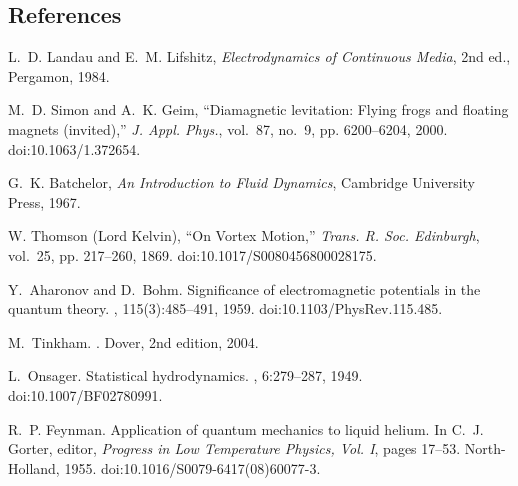 \documentclass[reprint,aps,onecolumn,nofootinbib]{revtex4-2}
\begin{document}
\subsection*{References}
\begin{thebibliography}{9}
	L.~D. Landau and E.~M. Lifshitz,
	\newblock \emph{Electrodynamics of Continuous Media}, 2nd ed.,
	Pergamon, 1984.

	M.~D. Simon and A.~K. Geim,
	``Diamagnetic levitation: Flying frogs and floating magnets (invited),''
	\emph{J. Appl. Phys.}, vol.~87, no.~9, pp. 6200--6204, 2000.
	doi:10.1063/1.372654.

	G.~K. Batchelor,
	\newblock \emph{An Introduction to Fluid Dynamics},
	Cambridge University Press, 1967.

	W. Thomson (Lord Kelvin),
	``On Vortex Motion,''
	\emph{Trans. R. Soc. Edinburgh}, vol.~25, pp. 217--260, 1869.
	doi:10.1017/S0080456800028175.
\end{thebibliography}


\begin{thebibliography}{10}

Y.~Aharonov and D.~Bohm.
\newblock Significance of electromagnetic potentials in the quantum theory.
, 115(3):485--491, 1959.
\newblock doi:10.1103/PhysRev.115.485.

M.~Tinkham.
.
\newblock Dover, 2nd edition, 2004.

L.~Onsager.
\newblock Statistical hydrodynamics.
, 6:279--287, 1949.
\newblock doi:10.1007/BF02780991.

R.~P. Feynman.
\newblock Application of quantum mechanics to liquid helium.
\newblock In C.~J. Gorter, editor, {\em Progress in Low Temperature Physics, Vol. I}, pages 17--53. North-Holland, 1955.
\newblock doi:10.1016/S0079-6417(08)60077-3.

\end{thebibliography}
\end{document}
